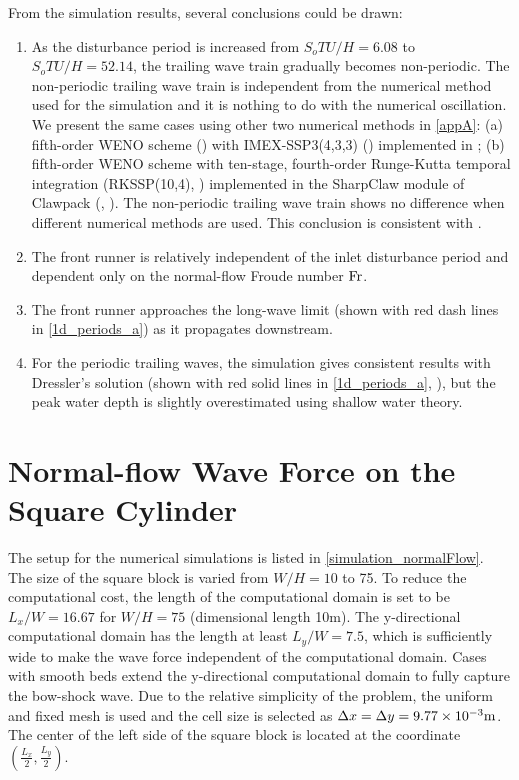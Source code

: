 \documentclass{jfm}
\newcommand{\fr}{{\rm{Fr}}}
\begin{document}
From the simulation results, several conclusions could be drawn: 
\begin{enumerate}
\item As the disturbance period is increased from  $S_oTU/H=6.08$ to $S_oTU/H=52.14$, the trailing wave train gradually becomes non-periodic. The non-periodic trailing wave train is independent from the numerical method used for the simulation and it is nothing to do with the numerical oscillation. We present the same cases using other two numerical methods in \autoref{appA}: (a) fifth-order WENO scheme (\cite{Jiang1996}) with IMEX-SSP3(4,3,3) (\cite{Pareschi2005}) implemented in \cite{Yu2021}; (b)  fifth-order WENO scheme with ten-stage, fourth-order Runge-Kutta temporal integration (RKSSP(10,4), \cite{Ketcheson2008})  implemented in the SharpClaw module of Clawpack (\cite{KetParLev13}, \cite{clawpack2021}). The non-periodic trailing wave train shows no difference when different  numerical methods are used.  This conclusion is consistent with \cite{Cao2015}.




\item The front runner is relatively independent of the inlet disturbance period and dependent only on the normal-flow Froude number $\fr$. 

\item The front runner approaches the long-wave limit (shown with red dash lines in \autoref{1d_periods_a}) as it propagates downstream.

\item For the periodic trailing waves, the simulation gives consistent results with Dressler's solution (shown with red solid lines in \autoref{1d_periods_a}, \cite{Dressler1949}), but the peak water depth is slightly overestimated using shallow water theory.

\end{enumerate}


\section{Normal-flow Wave Force on the Square Cylinder}
The setup for the numerical simulations is listed in \autoref{simulation_normalFlow}. The size of the square block is varied from $W/H=10$ to 75. To reduce the computational cost, the length of the computational domain is set to be $L_x/W=16.67$ for $W/H=75$ (dimensional length 10m). The y-directional computational domain has the length at least $L_y/W=7.5$, which is sufficiently wide to make the  wave force independent of the computational domain. Cases with smooth beds extend the y-directional computational domain to fully capture the bow-shock wave.  Due to the relative simplicity of the problem, the uniform and fixed mesh is used and the cell size is selected as $\Delta x = \Delta y = 9.77\times 10^{-3} {\rm{m}}$. The center of the left side of the square block is located at the coordinate $(\frac{L_x}{2}, \frac{L_y}{2})$. 
\end{document}
